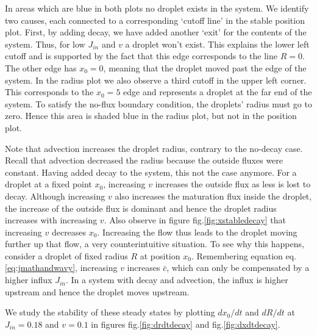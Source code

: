 \documentclass{Dissertate}
\begin{document}
In areas which are blue in both plots no droplet exists in the system.
We identify two causes, each connected to a corresponding `cutoff line'
in the stable position plot. First, by adding decay, we have added
another `exit' for the contents of the system. Thus, for low \(J_{in}\)
and \(v\) a droplet won't exist. This explains the lower left cutoff and
is supported by the fact that this edge corresponds to the line \(R=0\).
The other edge has \(x_0=0\), meaning that the droplet moved past the
edge of the system. In the radius plot we also observe a third cutoff in
the upper left corner. This corresponds to the \(x_0=5\) edge and
represents a droplet at the far end of the system. To satisfy the
no-flux boundary condition, the droplets' radius must go to zero. Hence
this area is shaded blue in the radius plot, but not in the position
plot.

Note that advection increases the droplet radius, contrary to the
no-decay case. Recall that advection decreased the radius because the
outside fluxes were constant. Having added decay to the system, this not
the case anymore. For a droplet at a fixed point \(x_0\), increasing
\(v\) increases the outside flux as less is lost to decay. Although
increasing \(v\) also increases the maturation flux inside the droplet,
the increase of the outside flux is dominant and hence the droplet
radius increases with increasing \(v\). Also observe in figure
fig.\ref{fig:xstabledecay} that increasing \(v\) decreases \(x_0\).
Increasing the flow thus leads to the droplet moving further up that
flow, a very counterintuitive situation. To see why this happens,
consider a droplet of fixed radius \(R\) at position \(x_0\).
Remembering equation eq.\ref{eq:jmathandwavy}, increasing \(v\)
increases \(\bar{c}\), which can only be compensated by a higher influx
\(J_{in}\). In a system with decay and advection, the influx is higher
upstream and hence the droplet moves upstream.

We study the stability of these steady states by plotting \(dx_0/dt\)
and \(dR/dt\) at \(J_{in} = 0.18\) and \(v=0.1\) in figures
fig.\ref{fig:drdtdecay} and fig.\ref{fig:dxdtdecay}.
\end{document}
